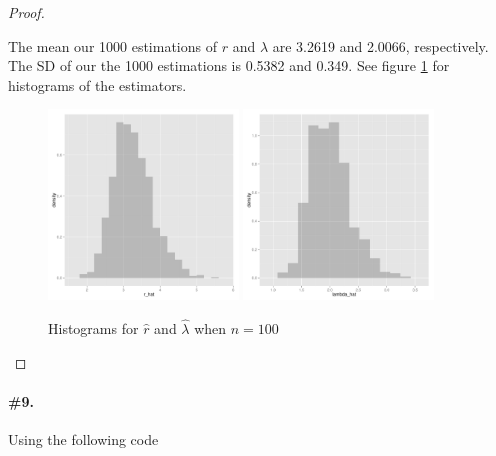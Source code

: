 \documentclass[12pt,titlepage]{article}\usepackage{graphicx, color}
\newenvironment{knitrout}{}{} %
\begin{document}
\begin{proof}
\begin{enumerate}
The mean our 1000 estimations of $r$ and $\lambda$ are 3.2619 and 2.0066, respectively. The SD of our the 1000 estimations is 0.5382 and 0.349. See figure \ref{fig:estimators_for_100} for histograms of the estimators.

\begin{figure}[ht!]
\centering
\begin{knitrout}
\color{fgcolor}\includegraphics[width=0.45\textwidth]{figure/partDPlots} 
\end{knitrout}
\begin{knitrout}
\color{fgcolor}\includegraphics[width=0.45\textwidth]{figure/partDPlots2} 
\end{knitrout}

\caption{Histograms for $\hat{r}$ and $\hat{\lambda}$ when $n=100$}
\label{fig:estimators_for_100}
\end{figure}
\end{enumerate}
\end{proof}

\paragraph{\#9.} Using the following code
\end{document}
